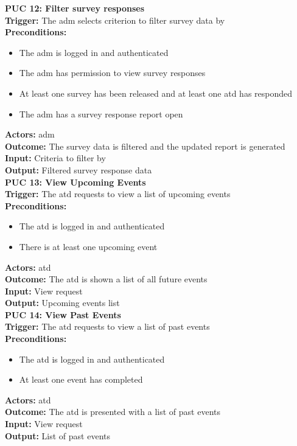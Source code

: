 \documentclass[12pt]{article}
\begin{document}
{\textbf{PUC 12: Filter survey responses} \\
\textbf{Trigger:} The \gls{adm} selects criterion to filter survey data by \\
\textbf{Preconditions:}
\begin{itemize}
  \item The \gls{adm} is logged in and authenticated
  \item The \gls{adm} has permission to view survey responses
  \item At least one survey has been released and at least one \gls{atd} has responded
  \item The \gls{adm} has a survey response report open
\end{itemize}
\textbf{Actors:} \Gls{adm} \\
\textbf{Outcome:} The survey data is filtered and the updated report is generated \\
\textbf{Input:} Criteria to filter by \\
\textbf{Output:} Filtered survey response data \\[1em]

\textbf{PUC 13: View Upcoming Events} \\
\textbf{Trigger:} The \gls{atd} requests to view a list of upcoming events \\
\textbf{Preconditions:}
\begin{itemize}
  \item The \gls{atd} is logged in and authenticated
  \item There is at least one upcoming event
\end{itemize}
\textbf{Actors:} \Gls{atd} \\
\textbf{Outcome:} The \gls{atd} is shown a list of all future events \\
\textbf{Input:} View request \\
\textbf{Output:} Upcoming events list \\[1em]

\textbf{PUC 14: View Past Events} \\
\textbf{Trigger:} The \gls{atd} requests to view a list of past events \\
\textbf{Preconditions:}
\begin{itemize}
  \item The \gls{atd} is logged in and authenticated
  \item At least one event has completed
\end{itemize}
\textbf{Actors:} \Gls{atd} \\
\textbf{Outcome:} The \gls{atd} is presented with a list of past events \\
\textbf{Input:} View request \\
\textbf{Output:} List of past events \\[1em]

}
\end{document}

